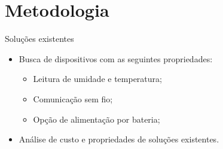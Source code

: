 \section{Metodologia}
\begin{frame}{Soluções existentes}

\begin{itemize}
    \item Busca de dispositivos com as seguintes propriedades:
        \begin{itemize}
            \item Leitura de umidade e temperatura;
            \item Comunicação sem fio;
            \item Opção de alimentação por bateria;
        \end{itemize}
    
    \item Análise de custo e propriedades de soluções existentes.
\end{itemize}
    
    
	
    \end{frame}
    
